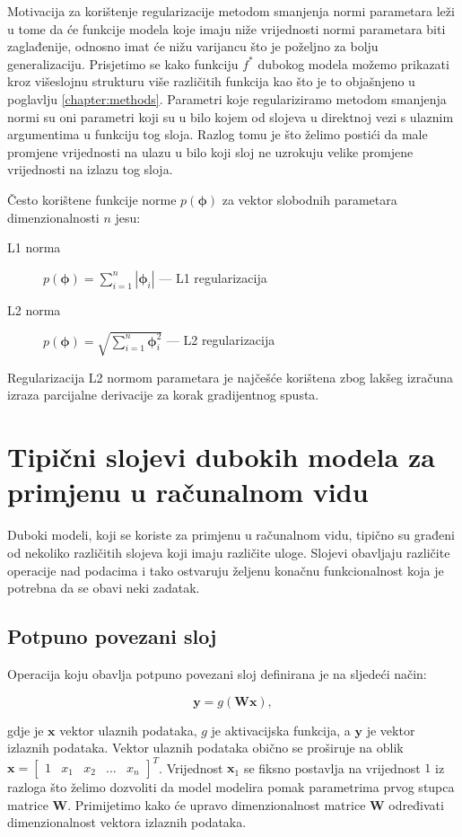 \documentclass[times, utf8, diplomski, numeric]{fer}
\begin{document}
Motivacija za korištenje regularizacije metodom smanjenja normi parametara leži u tome da će funkcije modela koje imaju niže vrijednosti normi parametara biti zaglađenije, odnosno imat će nižu varijancu što je poželjno za bolju generalizaciju.
Prisjetimo se kako funkciju $f^*$ dubokog modela možemo prikazati kroz višeslojnu strukturu više različitih funkcija kao što je to objašnjeno u poglavlju \ref{chapter:methods}.
Parametri koje regulariziramo metodom smanjenja normi su oni parametri koji su u bilo kojem od slojeva u direktnoj vezi s ulaznim argumentima u funkciju tog sloja.
Razlog tomu je što želimo postići da male promjene vrijednosti na ulazu u bilo koji sloj ne uzrokuju velike promjene vrijednosti na izlazu tog sloja.

Često korištene funkcije norme $p(\boldsymbol{\phi})$ za vektor slobodnih parametara dimenzionalnosti $n$ jesu:
\begin{description}
 \item [L1 norma] $p(\boldsymbol{\phi})=\sum_{i=1}^n \left| \boldsymbol{\phi}_i \right|$ --- L1  regularizacija
 \item [L2 norma] $p(\boldsymbol{\phi})=\sqrt{\sum_{i=1}^n  \boldsymbol{\phi}_i^2 }$ --- L2  regularizacija
\end{description}
Regularizacija L2 normom parametara je najčešće korištena zbog lakšeg izračuna izraza parcijalne derivacije za korak gradijentnog spusta.

\section{Tipični slojevi dubokih modela za primjenu u računalnom vidu}
Duboki modeli, koji se koriste za primjenu u računalnom vidu, tipično su građeni od nekoliko različitih slojeva koji imaju različite uloge.
Slojevi obavljaju različite operacije nad podacima i tako ostvaruju željenu konačnu funkcionalnost koja je potrebna da se obavi neki zadatak.

\subsection{Potpuno povezani sloj}
Operacija koju obavlja potpuno povezani sloj definirana je na sljedeći način:

\begin{equation}
 \mathbf{y}=g(\mathbf{W}\mathbf{x}),
\end{equation}

\noindent gdje je $\mathbf{x}$ vektor ulaznih podataka, $g$ je aktivacijska funkcija, a  $\mathbf{y}$ je vektor izlaznih podataka. 
Vektor ulaznih podataka obično se proširuje na oblik $\mathbf{x} = \begin{bmatrix} 1 & x_1 & x_2 & ... & x_n \end{bmatrix}^T$.
Vrijednost $\mathbf{x}_1$ se fiksno postavlja na vrijednost $1$ iz razloga što želimo dozvoliti da model modelira pomak parametrima prvog stupca matrice $\mathbf{W}$.
Primijetimo kako će upravo dimenzionalnost matrice $\mathbf{W}$ određivati dimenzionalnost vektora izlaznih podataka.
\end{document}
